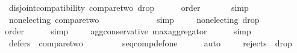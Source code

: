 \begin{isabellebody}
\ {}{}{}{\isacharcolon}{\kern0pt}\ {\isachardoublequoteopen}disjoint{\isacharunderscore}{\kern0pt}compatibility\ {\isacharquery}{\kern0pt}compare{\isacharunderscore}{\kern0pt}two\ {\isacharquery}{\kern0pt}drop{}{\isachardoublequoteclose}\isanewline
\ \ \ \ \isamarkupfalse%
\ order\ {}{}{}{}\isanewline
\ \ \ \ \isamarkupfalse%
\ simp\isanewline
\ \ \isamarkupfalse%
\ {}{}{}{\isacharcolon}{\kern0pt}\ {\isachardoublequoteopen}non{\isacharunderscore}{\kern0pt}electing\ {\isacharquery}{\kern0pt}compare{\isacharunderscore}{\kern0pt}two{\isachardoublequoteclose}\isanewline
\ \ \ \ \isamarkupfalse%
\ {}{}{}{}\ {}{}{}{}\isanewline
\ \ \ \ \isamarkupfalse%
\ simp\isanewline
\ \ \isamarkupfalse%
\ {}{}{}{\isacharcolon}{\kern0pt}\ {\isachardoublequoteopen}non{\isacharunderscore}{\kern0pt}electing\ {\isacharquery}{\kern0pt}drop{}{\isachardoublequoteclose}\isanewline
\ \ \ \ \isamarkupfalse%
\ order\isanewline
\ \ \ \ \isamarkupfalse%
\ simp\isanewline
\ \ \isamarkupfalse%
\ {}{}{}{\isacharcolon}{\kern0pt}\ {\isachardoublequoteopen}agg{\isacharunderscore}{\kern0pt}conservative\ max{\isacharunderscore}{\kern0pt}aggregator{\isachardoublequoteclose}\isanewline
\ \ \ \ \isamarkupfalse%
\ simp\isanewline
\ \ \isamarkupfalse%
\ {}{}{}{\isacharcolon}{\kern0pt}\ {\isachardoublequoteopen}defers\ {}\ {\isacharquery}{\kern0pt}compare{\isacharunderscore}{\kern0pt}two{\isachardoublequoteclose}\isanewline
\ \ \ \ \isamarkupfalse%
\ {}{}{}{}\ {}{}{}{}\ {}{}{}{}\ seq{\isacharunderscore}{\kern0pt}comp{\isacharunderscore}{\kern0pt}def{\isacharunderscore}{\kern0pt}one\isanewline
\ \ \ \ \isamarkupfalse%
\ auto\isanewline
\ \ \isamarkupfalse%
\ {}{}{}{\isacharcolon}{\kern0pt}\ {\isachardoublequoteopen}rejects\ {}\ {\isacharquery}{\kern0pt}drop{}{\isachardoublequoteclose}\isanewline
\ \ \ \ \isamarkupfalse%

\end{isabellebody}
